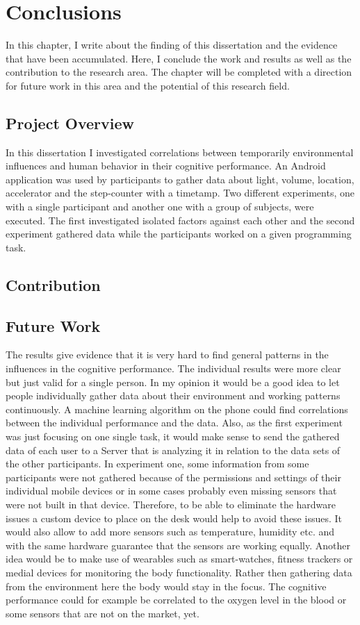 \chapter{Conclusions}
In this chapter, I write about the finding of this dissertation and the evidence that have been accumulated. Here, I conclude the work and results as well as the contribution to the research area. 
The chapter will be completed with a direction for future work in this area and the potential of this research field. 

\section{Project Overview}
In this dissertation I investigated correlations between temporarily environmental influences and human behavior in their cognitive performance. 
An Android application was used by participants to gather data about light, volume, location, accelerator and the step-counter with a timetamp.  
Two different experiments, one with a single participant and another one with a group of subjects, were executed. The first investigated isolated factors against each other and the second experiment gathered data while the participants worked on a given programming task. 

\section{Contribution}


\section{Future Work}
The results give evidence that it is very hard to find general patterns in the influences in the cognitive performance. The individual results were more clear but just valid for a single person. 
In my opinion it would be a good idea to let people individually gather data about their environment and working patterns continuously. A machine learning algorithm on the phone could find correlations between the individual performance and the data. Also, as the first experiment was just focusing on one single task, it would make sense to send the gathered data of each user to a Server that is analyzing it in relation to the data sets of the other participants. 
In experiment one, some information from some participants were not gathered because of the permissions and settings of their individual mobile devices or in some cases probably even missing sensors that were not built in that device. 
Therefore, to be able to eliminate the hardware issues a custom device to place on the desk would help to avoid these issues. It would also allow to add more sensors such as temperature, humidity etc. and with the same hardware guarantee that the sensors are working equally. 
Another idea would be to make use of wearables such as smart-watches, fitness trackers or medial devices for monitoring the body functionality. Rather then gathering data from the environment here the body would stay in the focus. The cognitive performance could for example be correlated to the oxygen level in the blood or some sensors that are not on the market, yet. 


